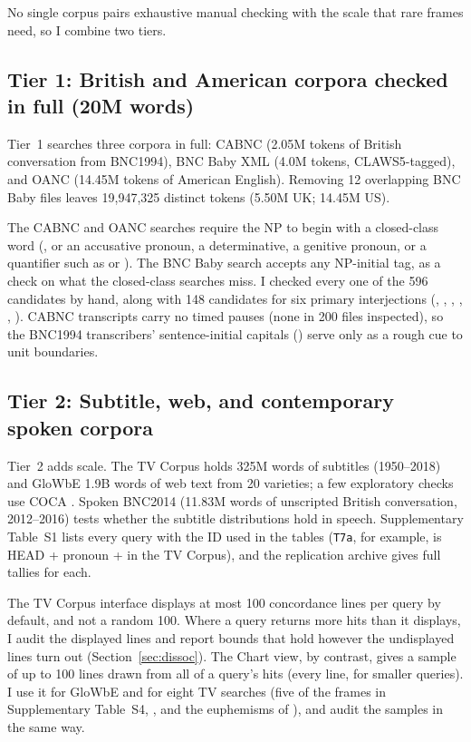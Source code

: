 \documentclass[12pt]{article}
\begin{document}
No single corpus pairs exhaustive manual checking with the scale that rare frames need, so I combine two tiers.

\subsection{Tier 1: British and American corpora checked in full (20M words)}
\label{sec:tier1-methods}

Tier~1 searches three corpora in full: CABNC \citep{albert2015cabnc} (2.05M tokens of British conversation from BNC1994), BNC Baby XML \citep{burnard2007bncbaby} (4.0M tokens, CLAWS5-tagged), and OANC \citep{ide2008oanc} (14.45M tokens of American English). Removing 12 overlapping BNC Baby files leaves 19,947,325 distinct tokens (5.50M UK; 14.45M US).

The CABNC and OANC searches require the NP to begin with a closed-class word (,  or an accusative pronoun, a determinative, a genitive pronoun, or a quantifier such as  or ). The BNC Baby search accepts any NP-initial tag, as a check on what the closed-class searches miss. I checked every one of the 596 candidates by hand, along with 148 candidates for six primary interjections (, , , , , ). CABNC transcripts carry no timed pauses (none in 200 files inspected), so the BNC1994 transcribers' sentence-initial capitals () serve only as a rough cue to unit boundaries.

\subsection{Tier 2: Subtitle, web, and contemporary spoken corpora}
\label{sec:tier2-methods}

Tier~2 adds scale. The TV Corpus \citep{davies2019tv} holds 325M words of subtitles (1950--2018) and GloWbE \citep{davies2013glowbe,daviesfuchs2015} 1.9B words of web text from 20 varieties; a few exploratory checks use COCA \citep{davies2020coca}. Spoken BNC2014 \citep{loveEtAl2017SpokenBNC2014} (11.83M words of unscripted British conversation, 2012--2016) tests whether the subtitle distributions hold in speech. Supplementary Table~S1 lists every query with the ID used in the tables (\texttt{T7a}, for example, is HEAD + pronoun +  in the TV Corpus), and the replication archive gives full tallies for each.

The TV Corpus interface displays at most 100 concordance lines per query by default, and not a random 100. Where a query returns more hits than it displays, I audit the displayed lines and report bounds that hold however the undisplayed lines turn out (Section~\ref{sec:dissoc}). The Chart view, by contrast, gives a sample of up to 100 lines drawn from all of a query's hits (every line, for smaller queries). I use it for GloWbE and for eight TV searches (five of the frames in Supplementary Table~S4, ,  and the euphemisms of ), and audit the samples in the same way.
\end{document}

